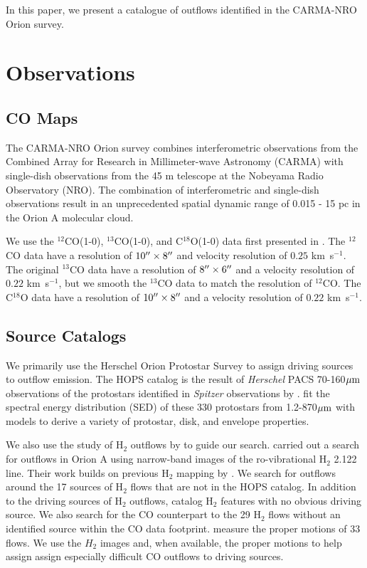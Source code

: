 \documentclass[twocolumn]{aastex63}
\newcommand{\kms}{km~s$^{-1}$}
\newcommand{\co}[1][]{\ensuremath{^{#1}}CO}
\begin{document}
In this paper, we present a catalogue of outflows identified in the CARMA-NRO Orion survey. 

\section{Observations}

\subsection{CO Maps}
The CARMA-NRO Orion survey combines interferometric observations from the Combined Array for Research in Millimeter-wave Astronomy (CARMA) with single-dish observations from the 45 m telescope at the Nobeyama Radio Observatory (NRO). The combination of interferometric and single-dish observations result in an unprecedented spatial dynamic range of 0.015 - 15 pc in the Orion A molecular cloud.

We use the \co[12](1-0), \co[13](1-0), and C$^{18}$O(1-0) data first presented in \citet{Kong18}. The \co[12]{} data have a resolution of $10\mbox{$^{\prime\prime}$}\times8\mbox{$^{\prime\prime}$}$ and velocity resolution of $0.25$ \kms{}. The original \co[13] data have a resolution of $8\mbox{$^{\prime\prime}$}\times6\mbox{$^{\prime\prime}$}$ and a velocity resolution of $0.22$ \kms{}, but we smooth the \co[13]{} data to match the resolution of \co[12]{}. The C$^{18}$O data have a resolution of $10\mbox{$^{\prime\prime}$}\times8\mbox{$^{\prime\prime}$}$ and a velocity resolution of $0.22$ \kms{}.

\subsection{Source Catalogs}
We primarily use the Herschel Orion Protostar Survey \citep[HOPS;][]{Furlan16} to assign driving sources to outflow emission. The HOPS catalog is the result of \emph{Herschel} PACS 70-160$\mbox{$\mu$m}{}$ observations of the protostars identified in \emph{Spitzer} observations by \citet{Megeath12}. \citet{Furlan16} fit the spectral energy distribution (SED) of these 330 protostars from 1.2-870$\mbox{$\mu$m}{}$ with models to derive a variety of protostar, disk, and envelope properties.

We also use the study of H$_2$ outflows by \citet{Davis09} to guide our search. \citet{Davis09} carried out a search for outflows in Orion A using narrow-band images of the ro-vibrational H$_2$ 2.122 \micron{} line. Their work builds on previous H$_2$ mapping by \citet{Stanke02}. We search for outflows around the 17 sources of H$_2$ flows that are not in the HOPS catalog. In addition to the driving sources of H$_2$ outflows, \citet{Davis09} catalog H$_2$ features with no obvious driving source. We also search for the CO counterpart to the 29 H$_2$ flows without an identified source within the CO data footprint. \citet{Davis09} measure the proper motions of 33 flows. We use the $H_2$ images and, when available, the proper motions to help assign assign especially difficult CO outflows to driving sources.
\end{document}

